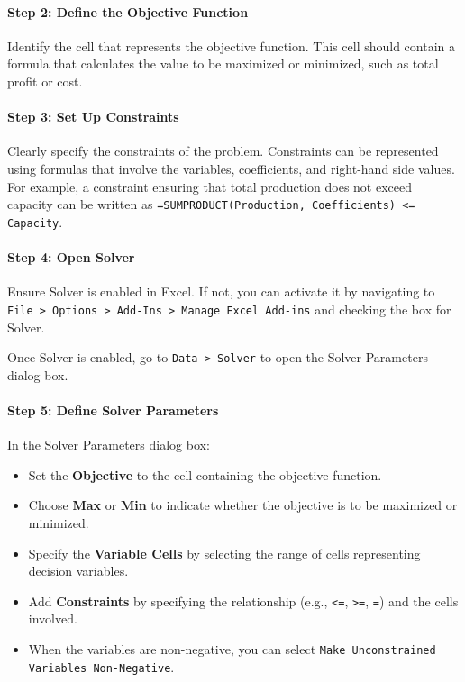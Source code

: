 \paragraph{Step 2: Define the Objective Function}
Identify the cell that represents the objective function. This cell should contain a formula that calculates the value to be maximized or minimized, such as total profit or cost.

\paragraph{Step 3: Set Up Constraints}
Clearly specify the constraints of the problem. Constraints can be represented using formulas that involve the variables, coefficients, and right-hand side values. For example, a constraint ensuring that total production does not exceed capacity can be written as \texttt{=SUMPRODUCT(Production, Coefficients) <= Capacity}.

\paragraph{Step 4: Open Solver}
Ensure Solver is enabled in Excel. If not, you can activate it by navigating to \texttt{File > Options > Add-Ins > Manage Excel Add-ins} and checking the box for Solver.

Once Solver is enabled, go to \texttt{Data > Solver} to open the Solver Parameters dialog box.
{\centering
{}\par{}\label{fig:excel-solver-button}%
\par}

\paragraph{Step 5: Define Solver Parameters}
In the Solver Parameters dialog box:
\begin{itemize}
    \item Set the \textbf{Objective} to the cell containing the objective function.
    \item Choose \textbf{Max} or \textbf{Min} to indicate whether the objective is to be maximized or minimized.
    \item Specify the \textbf{Variable Cells} by selecting the range of cells representing decision variables.
    \item Add \textbf{Constraints} by specifying the relationship (e.g., \texttt{<=}, \texttt{>=}, \texttt{=}) and the cells involved.
    \item When the variables are non-negative, you can select \texttt{Make Unconstrained Variables Non-Negative}.
\end{itemize}

